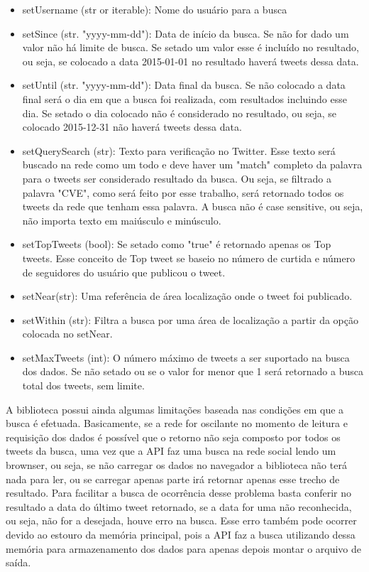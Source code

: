 \begin{itemize}
\item setUsername (str or iterable): Nome do usuário para a busca
\item setSince (str. "yyyy-mm-dd"): Data de início da busca. Se não for dado um valor não há limite de busca. Se setado um valor esse é incluído no resultado, ou seja, se colocado a data 2015-01-01 no resultado haverá tweets dessa data.
\item setUntil (str. "yyyy-mm-dd"): Data final da busca. Se não colocado a data final será o dia em que a busca foi realizada, com resultados incluindo esse dia. Se setado o dia colocado não é considerado no resultado, ou seja, se colocado 2015-12-31 não haverá tweets dessa data.
\item setQuerySearch (str): Texto para verificação no Twitter. Esse texto será buscado na rede como um todo e deve haver um "match" completo da palavra para o tweets ser considerado resultado da busca. Ou seja, se filtrado a palavra "CVE", como será feito por esse trabalho, será retornado todos os tweets da rede que tenham essa palavra. A busca não é case sensitive, ou seja, não importa texto em maiúsculo e minúsculo.
\item setTopTweets (bool): Se setado como "true" é retornado apenas os Top tweets. Esse conceito de Top tweet se baseio no número de curtida e número de seguidores do usuário que publicou o tweet.
\item setNear(str): Uma referência de área localização onde o tweet foi publicado. 
\item setWithin (str): Filtra a busca por uma área de localização a partir da opção colocada no setNear.
\item setMaxTweets (int): O número máximo de tweets a ser suportado na busca dos dados. Se não setado ou se o valor for menor que 1 será retornado a busca total dos tweets, sem limite.
\end{itemize}

A biblioteca possui ainda algumas limitações baseada nas condições em que a busca é efetuada. Basicamente, se a rede for oscilante no momento de leitura e requisição dos dados é possível que o retorno não seja composto por todos os tweets da busca, uma vez que a API faz uma busca na rede social lendo um brownser, ou seja, se não carregar os dados no navegador a biblioteca não terá nada para ler, ou se carregar apenas parte irá retornar apenas esse trecho de resultado. Para facilitar a busca de ocorrência desse problema basta conferir no resultado a data do último tweet retornado, se a data for uma não reconhecida, ou seja, não for a desejada, houve erro na busca. Esse erro também pode ocorrer devido ao estouro da memória principal, pois a API faz a busca utilizando dessa memória para armazenamento dos dados para apenas depois montar o arquivo de saída.

